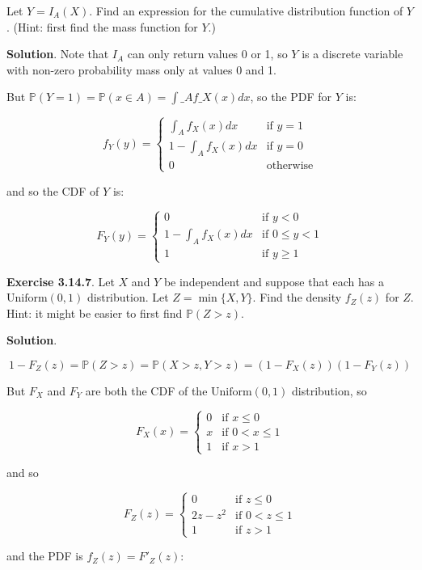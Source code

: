 Let \(Y = I_A(X)\). Find an expression for the cumulative distribution
function of \(Y\). (Hint: first find the mass function for \(Y\).)

\textbf{Solution}. Note that \(I_A\) can only return values 0 or 1, so
\(Y\) is a discrete variable with non-zero probability mass only at
values 0 and 1.

But $\mathbb{P}(Y = 1) = \mathbb{P}(x \in A) = \int\_A f\_X(x) dx $,
so the PDF for \(Y\) is:

\[ f_Y(y) = \begin{cases}
\int_A f_X(x) dx &\text{if } y = 1 \\
1 - \int_A f_X(x) dx &\text{if } y = 0 \\
0 &\text{otherwise}
\end{cases} \]

and so the CDF of \(Y\) is:

\[
F_Y(y) = \begin{cases}
0 &\text{if } y < 0 \\
1 - \int_A f_X(x) dx &\text{if } 0 \leq y < 1 \\
1 &\text{if } y \geq 1
\end{cases}
\]

\textbf{Exercise 3.14.7}. Let \(X\) and \(Y\) be independent and suppose
that each has a \(\text{Uniform}(0, 1)\) distribution. Let
\(Z = \min \{ X, Y \}\). Find the density \(f_Z(z)\) for \(Z\). Hint: it
might be easier to first find \(\mathbb{P}(Z > z)\).

\textbf{Solution}.

\[1 - F_Z(z) = \mathbb{P}(Z > z) = \mathbb{P}(X > z, Y > z) = (1 - F_X(z)) (1 - F_Y(z)) \]

But \(F_X\) and \(F_Y\) are both the CDF of the \(\text{Uniform}(0, 1)\)
distribution, so

\[ F_X(x) = \begin{cases}
0 &\text{if } x \leq 0 \\
x &\text{if } 0 < x \leq 1 \\
1 &\text{if } x > 1
\end{cases} \]

and so

\[ F_Z(z) = \begin{cases}
0 &\text{if } z \leq 0 \\
2z - z^{2} &\text{if } 0 < z \leq 1 \\
1 &\text{if } z > 1
\end{cases} \]

and the PDF is \(f_Z(z) = F'_Z(z)\):

